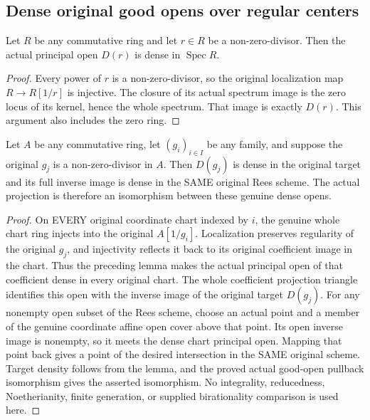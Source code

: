 \subsection{Dense original good opens over regular centers}
\begin{lemma}
\label{scheme:regular-principal-open-dense}
\leanok
Let $R$ be any commutative ring and let $r\in R$ be a non-zero-divisor.
Then the actual principal open $D(r)$ is dense in $\operatorname{Spec}R$.
\end{lemma}
\begin{proof}
Every power of $r$ is a non-zero-divisor, so the original localization
map $R\to R[1/r]$ is injective. The closure of its actual spectrum image
is the zero locus of its kernel, hence the whole spectrum. That image
is exactly $D(r)$. This argument also includes the zero ring.
\end{proof}
\begin{theorem}
\label{scheme:actual-rees-good-open-density}
\leanok
{}
Let $A$ be any commutative ring, let $(g_i)_{i\in I}$ be any family,
and suppose the original $g_j$ is a non-zero-divisor in $A$.
Then $D(g_j)$ is dense in the original target and its full inverse image
is dense in the SAME original Rees scheme. The actual projection is
therefore an isomorphism between these genuine dense opens.
\end{theorem}
\begin{proof}
On EVERY original coordinate chart indexed by $i$, the genuine whole
chart ring injects into the original $A[1/g_i]$. Localization preserves
regularity of the original $g_j$, and injectivity reflects it back to
its original coefficient image in the chart. Thus the preceding lemma
makes the actual principal open of that coefficient dense in every
original chart. The whole coefficient projection triangle identifies
this open with the inverse image of the original target $D(g_j)$.
For any nonempty open subset of the Rees scheme, choose an actual point
and a member of the genuine coordinate affine open cover above that point.
Its open inverse image is nonempty, so it meets the dense chart principal
open. Mapping that point back gives a point of the desired intersection
in the SAME original scheme. Target density follows from the lemma,
and the proved actual good-open pullback isomorphism gives
the asserted isomorphism. No integrality, reducedness, Noetherianity,
finite generation, or supplied birationality comparison is used here.
\end{proof}
